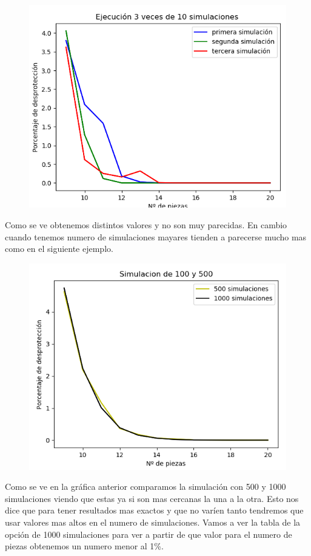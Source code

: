 \documentclass[]{article}
\begin{document}
\begin{figure}[H]
	\centering
	\includegraphics[width=1\linewidth]{img/screenshot0016}
	\caption{}
	\label{fig:screenshot0016}
\end{figure}

Como se ve obtenemos distintos valores y no son muy parecidas. En cambio cuando tenemos numero de simulaciones mayares tienden a parecerse mucho mas como en el siguiente ejemplo.

\begin{figure}[H]
	\centering
	\includegraphics[width=1\linewidth]{img/screenshot0017}
	\label{fig:screenshot0017}
\end{figure}
Como se ve en la gráfica anterior comparamos la simulación con 500 y 1000 simulaciones viendo que estas ya si son mas cercanas la una a la otra. Esto nos dice que para tener resultados mas exactos y que no varíen tanto tendremos que usar valores mas altos en el numero de simulaciones. Vamos a ver la tabla de la opción de 1000 simulaciones para ver a partir de que valor para el numero de piezas obtenemos un numero menor al 1\%.
\end{document}
